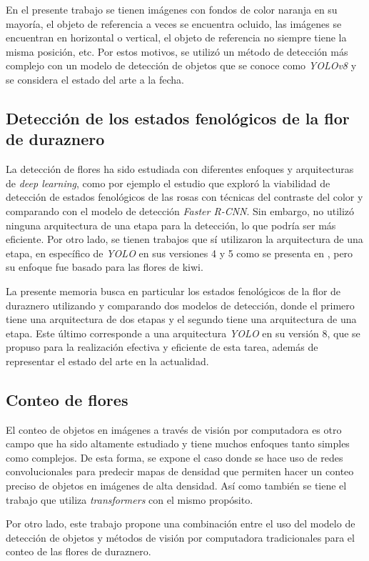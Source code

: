 En el presente trabajo se tienen imágenes con fondos de color naranja en su mayoría, el objeto de referencia a veces se encuentra ocluido, las imágenes se encuentran en horizontal o vertical, el objeto de referencia no siempre tiene la misma posición, etc. Por estos motivos, se utilizó un método de detección más complejo con un modelo de detección de objetos que se conoce como \textit{YOLOv8} y se considera el estado del arte a la fecha.

\subsection{Detección de los estados fenológicos de la flor de duraznero}
 
La detección de flores ha sido estudiada con diferentes enfoques y arquitecturas de \textit{deep learning}, como por ejemplo el estudio \cite{ARTICLE:3} que exploró la viabilidad de detección de estados fenológicos de las rosas con técnicas del contraste del color y comparando con el modelo de detección \textit{Faster R-CNN}. Sin embargo, no utilizó ninguna arquitectura de una etapa para la detección, lo que podría ser más eficiente. Por otro lado, se tienen trabajos que sí utilizaron la arquitectura de una etapa, en específico de \textit{YOLO} en sus versiones 4 y 5 como se presenta en \cite{ARTICLE:4} \cite{ARTICLE:5}, pero su enfoque fue basado para las flores de kiwi.

La presente memoria busca en particular los estados fenológicos de la flor de duraznero utilizando y comparando dos modelos de detección, donde el primero tiene una arquitectura de dos etapas y el segundo tiene una arquitectura de una etapa. Este último corresponde a una arquitectura \textit{YOLO} en su versión 8, que se propuso para la realización efectiva y eficiente de esta tarea, además de representar el estado del arte en la actualidad.

\subsection{Conteo de flores}

El conteo de objetos en imágenes a través de visión por computadora es otro campo que ha sido altamente estudiado y tiene muchos enfoques tanto simples como complejos. De esta forma, se expone el caso \cite{ARTICLE:6} donde se hace uso de redes convolucionales para predecir mapas de densidad que permiten hacer un conteo preciso de objetos en imágenes de alta densidad. Así como también se tiene el trabajo \cite{ARTICLE:7} que utiliza \textit{transformers} con el mismo propósito.

Por otro lado, este trabajo propone una combinación entre el uso del modelo de detección de objetos y métodos de visión por computadora tradicionales para el conteo de las flores de duraznero.





